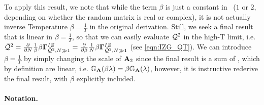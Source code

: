 To apply this result, we note that
while the term $\beta$ is just a constant in~\cite{Tanaka2008}
($1$ or $2$, depending on whether the random matrix is real or complex),
it is not actually inverse Temperature $\beta=\tfrac{1}{T}$ in the original derivation.
Still, we seek a final result that is linear in $\beta=\tfrac{1}{T}$,
so that we can easily evaluate $\bar{\mathcal{Q}}^{2}$ in the high-T limit, i.e.
$\bar{\mathcal{Q}}^{2}
=\tfrac{\partial}{\partial N}\tfrac{1}{\beta}\beta\mathbf{\Gamma}^{IZ}_{\bar{\mathcal{Q}}^{2},N\gg 1}
=\tfrac{\partial}{\partial \beta}\tfrac{1}{N}\beta\mathbf{\Gamma}^{IZ}_{\bar{\mathcal{Q}}^{2},N\gg 1}$
(see \ref{eqn:IZG_QT}).
We can introduce $\beta=\tfrac{1}{T}$ by
simply changing the scale of $\mathbf{A}_{2}$ since the final result is a sum of \RTransforms, which by definition
are linear, i.e. $\mathbb{G}_{\mathbf{A}}(\beta\lambda)=\beta \mathbb{G}_{\mathbf{A}}(\lambda)$, however, it is instructive
rederive the final result, with $\beta$ explicitly included.



\paragraph{Notation.}

